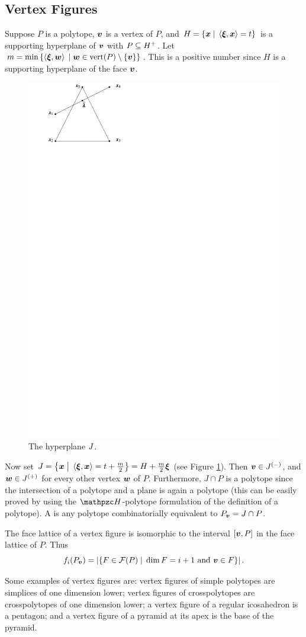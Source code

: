     \subsection{Vertex Figures}
        Suppose \(P\) is a polytope, \(\bm{v}\) is a vertex of \(P\), and \(H=\setb{\ve x}{\ip{\ve\xi}{\ve x}=t}\) is a supporting hyperplane of \(\bm{v}\) with \(P\subseteq H^+\).  Let \(m=\min\setb{\ip{\ve \xi}{\ve w}}{\ve w\in\vrt(P)\setminus\seta{\ve v}}\).  This is a positive number since \(H\) is a supporting hyperplane of the face \(\bm{v}\).
        \begin{center}
            \begin{figure}[h!bt]
                \includegraphics[page=25, width=.3\textwidth]{pictures.pdf}
                \caption{The hyperplane \protect$J\protect$.\label{Fig:HypJ}}
            \end{figure}
        \end{center}
        Now set \(J=\setb{\ve x}{\ip{\ve\xi}{\ve x}=t+\frac m2}=H+\frac m2\ve\xi\) (see Figure \ref{Fig:HypJ}).  Then \(\bm{v}\in J^{(-)}\), and \(\bm{w}\in J^{(+)}\) for every other vertex \(\bm{w}\) of \(P\).  Furthermore, \(J\cap P\) is a polytope since the intersection of a polytope and a plane is again a polytope (this can be easily proved by using the \(\mathpzc H\)-polytope formulation of the definition of a polytope).  A  is any polytope combinatorially equivalent to \(P_{\bm{v}}=J\cap P\).

        The face lattice of a vertex figure is isomorphic to the interval \([\bm{v}, P]\) in the face lattice of \(P\).  Thus
            \[
                f_i(P_{\ve v})
                    =   \card{\setb{F\in \fl P}{\dim F=i+1\text{ and } \ve v\in F}}.
            \]

        Some examples of vertex figures are: vertex figures of simple polytopes are simplices of one dimension lower; vertex figures of crosspolytopes are crosspolytopes of one dimension lower; a vertex figure of a regular icosahedron is a pentagon; and a vertex figure of a pyramid at its apex is the base of the pyramid.


